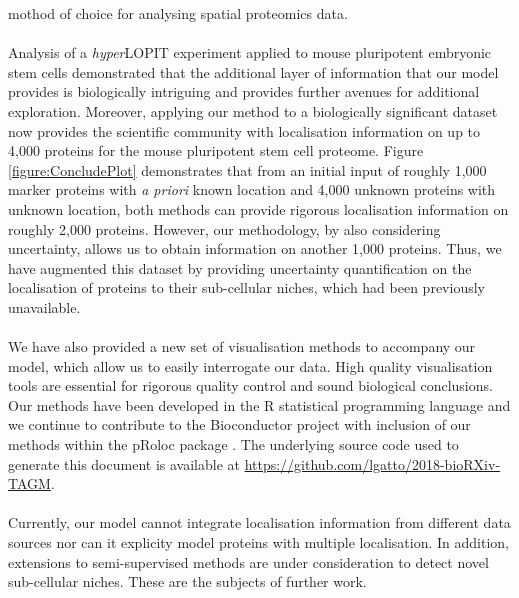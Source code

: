 \documentclass[12pt,english]{article}
\begin{document}
mothod of choice for analysing spatial proteomics data.
\\
\\
Analysis of a \textit{hyper}LOPIT experiment applied to mouse
pluripotent embryonic stem cells demonstrated that the additional
layer of information that our model provides is biologically
intriguing and provides further avenues for additional
exploration. Moreover, applying our method to a biologically
significant dataset now provides the scientific community with
localisation information on up to 4,000 proteins for the mouse
pluripotent stem cell proteome. Figure \ref{figure:ConcludePlot}
demonstrates that from an initial input of roughly 1,000 marker
proteins with \textit{a priori} known location and 4,000 unknown
proteins with unknown location, both methods can provide rigorous
localisation information on roughly 2,000 proteins. However, our
methodology, by also considering uncertainty, allows us to obtain
information on another 1,000 proteins.  Thus, we have augmented this
dataset by providing uncertainty quantification on the localisation of
proteins to their sub-cellular niches, which had been previously
unavailable.
\\
\\
We have also provided a new set of visualisation methods to accompany
our model, which allow us to easily interrogate our data. High quality
visualisation tools are essential for rigorous quality control and
sound biological conclusions.  Our methods have been developed in the
R statistical programming language and we continue to contribute to
the Bioconductor project \citep{Bioconductor::2004, Huber::2015} with
inclusion of our methods within the pRoloc package
\citep{pRoloc:2014}. The underlying source code used to generate this
document is available at
\url{https://github.com/lgatto/2018-bioRXiv-TAGM}.
\\
\\
Currently, our model cannot integrate localisation information from
different data sources nor can it explicity model proteins with
multiple localisation. In addition, extensions to semi-supervised
methods are under consideration to detect novel sub-cellular
niches. These are the subjects of further work.
\end{document}
